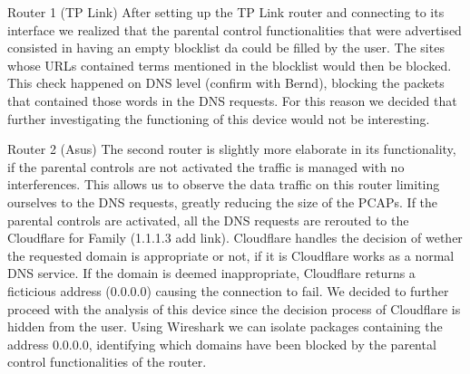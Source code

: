 Router 1 (TP Link)
After setting up the TP Link router and connecting to its interface we realized that the parental control functionalities that were advertised consisted in having an empty blocklist da could be filled by the user.
The sites whose URLs contained terms mentioned in the blocklist would then be blocked.
This check happened on DNS level (confirm with Bernd), blocking the packets that contained those words in the DNS requests.
For this reason we decided that further investigating the functioning of this device would not be interesting.

Router 2 (Asus)
The second router is slightly more elaborate in its functionality, if the parental controls are not activated the traffic is managed with no interferences.
This allows us to observe the data traffic on this router limiting ourselves to the DNS requests, greatly reducing the size of the PCAPs.
If the parental controls are activated, all the DNS requests are rerouted to the Cloudflare for Family (1.1.1.3 add link).
Cloudflare handles the decision of wether the requested domain is appropriate or not, if it is Cloudflare works as a normal DNS service.
If the domain is deemed inappropriate, Cloudflare returns a ficticious address (0.0.0.0) causing the connection to fail.
We decided to further proceed with the analysis of this device since the decision process of Cloudflare is hidden from the user.
Using Wireshark we can isolate packages containing the address 0.0.0.0, identifying which domains have been blocked by the parental control functionalities of the router.

